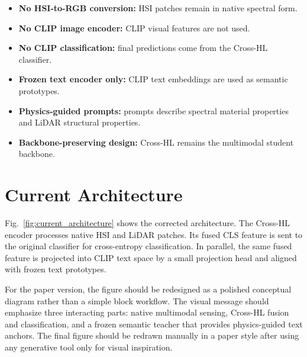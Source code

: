 \documentclass[10pt,journal,compsoc]{IEEEtran}
\begin{document}
\begin{itemize}
    \item \textbf{No HSI-to-RGB conversion:} HSI patches remain in native spectral form.
    \item \textbf{No CLIP image encoder:} CLIP visual features are not used.
    \item \textbf{No CLIP classification:} final predictions come from the Cross-HL classifier.
    \item \textbf{Frozen text encoder only:} CLIP text embeddings are used as semantic prototypes.
    \item \textbf{Physics-guided prompts:} prompts describe spectral material properties and LiDAR structural properties.
    \item \textbf{Backbone-preserving design:} Cross-HL remains the multimodal student backbone.
\end{itemize}

\section{Current Architecture}

Fig.~\ref{fig:current_architecture} shows the corrected architecture. The Cross-HL encoder processes native HSI and LiDAR patches. Its fused CLS feature is sent to the original classifier for cross-entropy classification. In parallel, the same fused feature is projected into CLIP text space by a small projection head and aligned with frozen text prototypes.

For the paper version, the figure should be redesigned as a polished conceptual diagram rather than a simple block workflow. The visual message should emphasize three interacting parts: native multimodal sensing, Cross-HL fusion and classification, and a frozen semantic teacher that provides physics-guided text anchors. The final figure should be redrawn manually in a paper style after using any generative tool only for visual inspiration.
\end{document}

